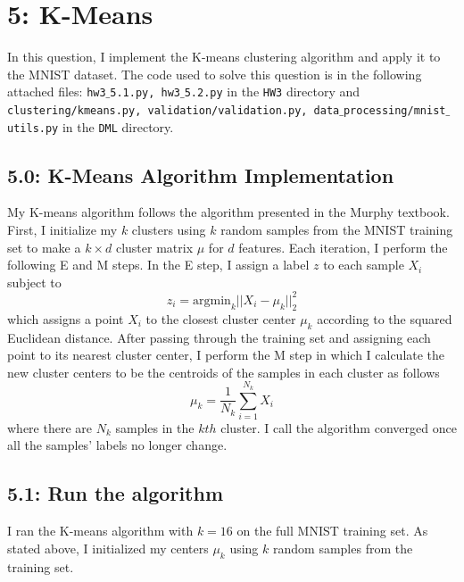 \documentclass[12pt]{amsart}
\begin{document}
\section*{5: K-Means}

In this question, I implement the K-means clustering algorithm and apply it to the MNIST dataset.  The code used to solve this question is in the following attached files: {\tt hw3$\_$5.1.py, hw3$\_$5.2.py} in the {\tt HW3} directory and {\tt clustering/kmeans.py, validation/validation.py, data$\_$processing/mnist$\_$utils.py} in the {\tt DML} directory.

\subsection*{5.0: K-Means Algorithm Implementation}

My K-means algorithm follows the algorithm presented in the Murphy textbook.  First, I initialize my $k$ clusters using $k$ random samples from the MNIST training set to make a $k \times d$ cluster matrix $\mu$ for $d$ features.  Each iteration, I perform the following E and M steps.  In the E step, I assign a label $z$ to each sample $X_i$ subject to
\begin{equation} \label{eqn:E_step}
z_i = \text{argmin}_k ||X_i - \mu_k ||_2^2
\end{equation}
which assigns a point $X_i$ to the closest cluster center $\mu_k$ according to the squared Euclidean distance.  After passing through the training set and assigning each point to its nearest cluster center, I perform the M step in which I calculate the new cluster centers to be the centroids of the samples in each cluster as follows
\begin{equation} \label{eqn:M_step}
\mu_k = \frac{1}{N_k} \sum_{i = 1}^{N_k} X_i
\end{equation}
where there are $N_k$ samples in the $kth$ cluster.  I call the algorithm converged once all the samples' labels no longer change.

\subsection*{5.1: Run the algorithm}
I ran the K-means algorithm with $k = 16$ on the full MNIST training set.  As stated above, I initialized my centers $\mu_k$ using $k$ random samples from the training set.
\end{document}
